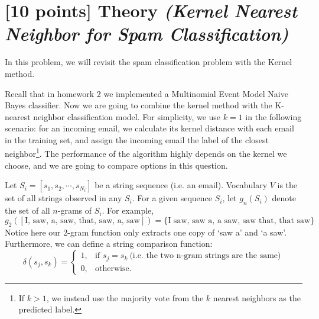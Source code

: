 \documentclass{article}
\begin{document}
\clearpage

\section{[10 points] Theory \it{(Kernel Nearest Neighbor for Spam Classification)}}

In this problem, we will revisit the spam classification problem with the Kernel method. 

Recall that in homework 2 we implemented a Multinomial Event Model Naive Bayes classifier. Now we are going to combine the kernel method with the  K-nearest neighbor classification model. For simplicity, we use $k=1$ in the following scenario: for an incoming email, we calculate its kernel distance with each email in the training set, and assign the incoming email the label of the closest neighbor\footnote{If $k > 1$, we instead use the majority vote from the $k$ nearest neighbors as the predicted label.}. The performance of the algorithm highly depends on the kernel we choose, and we are going to compare options in this question.  

Let $S_i = [s_1, s_2, \cdots, s_{N_i}]$ be a string sequence (i.e. an email). Vocabulary $V$ is the set of all strings observed in any $S_i$. For a given sequence $S_i$, let $g_n(S_i)$ denote the set of all $n$-grams of $S_i$. For example,
    $$
        g_2([\text{I, saw, a, saw, that, saw, a, saw} ]) = \{\text{I saw},\,\text{saw a},\,\text{a saw},\,\text{saw that},\,\text{that saw}\}
    $$
    Notice here our 2-gram function only extracts one copy of `saw a' and `a saw'. Furthermore, we can define a string comparison function: 
\[
    \delta(s_j, s_k) =
\begin{cases}
  1,& \text{if } s_j = s_k\ \text{(i.e. the two n-gram strings are the same)}\\
    0,& \text{otherwise.}
\end{cases}
\]
\end{document}

